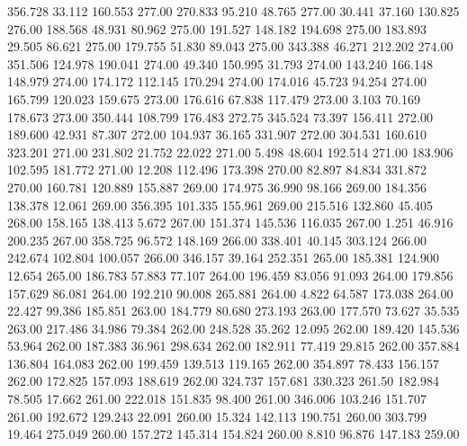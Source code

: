  356.728   33.112  160.553       277.00
 270.833   95.210   48.765       277.00
  30.441   37.160  130.825       276.00
 188.568   48.931   80.962       275.00
 191.527  148.182  194.698       275.00
 183.893   29.505   86.621       275.00
 179.755   51.830   89.043       275.00
 343.388   46.271  212.202       274.00
 351.506  124.978  190.041       274.00
  49.340  150.995   31.793       274.00
 143.240  166.148  148.979       274.00
 174.172  112.145  170.294       274.00
 174.016   45.723   94.254       274.00
 165.799  120.023  159.675       273.00
 176.616   67.838  117.479       273.00
   3.103   70.169  178.673       273.00
 350.444  108.799  176.483       272.75
 345.524   73.397  156.411       272.00
 189.600   42.931   87.307       272.00
 104.937   36.165  331.907       272.00
 304.531  160.610  323.201       271.00
 231.802   21.752   22.022       271.00
   5.498   48.604  192.514       271.00
 183.906  102.595  181.772       271.00
  12.208  112.496  173.398       270.00
  82.897   84.834  331.872       270.00
 160.781  120.889  155.887       269.00
 174.975   36.990   98.166       269.00
 184.356  138.378   12.061       269.00
 356.395  101.335  155.961       269.00
 215.516  132.860   45.405       268.00
 158.165  138.413    5.672       267.00
 151.374  145.536  116.035       267.00
   1.251   46.916  200.235       267.00
 358.725   96.572  148.169       266.00
 338.401   40.145  303.124       266.00
 242.674  102.804  100.057       266.00
 346.157   39.164  252.351       265.00
 185.381  124.900   12.654       265.00
 186.783   57.883   77.107       264.00
 196.459   83.056   91.093       264.00
 179.856  157.629   86.081       264.00
 192.210   90.008  265.881       264.00
   4.822   64.587  173.038       264.00
  22.427   99.386  185.851       263.00
 184.779   80.680  273.193       263.00
 177.570   73.627   35.535       263.00
 217.486   34.986   79.384       262.00
 248.528   35.262   12.095       262.00
 189.420  145.536   53.964       262.00
 187.383   36.961  298.634       262.00
 182.911   77.419   29.815       262.00
 357.884  136.804  164.083       262.00
 199.459  139.513  119.165       262.00
 354.897   78.433  156.157       262.00
 172.825  157.093  188.619       262.00
 324.737  157.681  330.323       261.50
 182.984   78.505   17.662       261.00
 222.018  151.835   98.400       261.00
 346.006  103.246  151.707       261.00
 192.672  129.243   22.091       260.00
  15.324  142.113  190.751       260.00
 303.799   19.464  275.049       260.00
 157.272  145.314  154.824       260.00
   8.810   96.876  147.183       259.00
